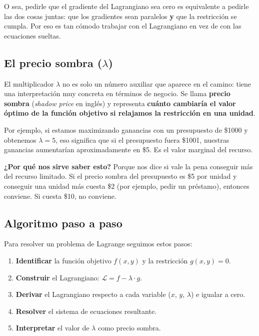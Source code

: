 \documentclass[12pt]{article}
\begin{document}
\vspace{0.5em}

O sea, pedirle que el gradiente del Lagrangiano sea cero es equivalente a pedirle las dos cosas juntas: que los gradientes sean paralelos \textbf{y} que la restricción se cumpla. Por eso es tan cómodo trabajar con el Lagrangiano en vez de con las ecuaciones sueltas.

\subsection{El precio sombra ($\lambda$)}

El multiplicador $\lambda$ no es solo un número auxiliar que aparece en el camino: tiene una interpretación muy concreta en términos de negocio. Se llama \textbf{precio sombra} (\textit{shadow price} en inglés) y representa \textbf{cuánto cambiaría el valor óptimo de la función objetivo si relajamos la restricción en una unidad}.

\vspace{0.5em}

Por ejemplo, si estamos maximizando ganancias con un presupuesto de \$1000 y obtenemos $\lambda = 5$, eso significa que si el presupuesto fuera \$1001, nuestras ganancias aumentarían aproximadamente en \$5. Es el valor marginal del recurso.

\vspace{0.5em}

\textbf{¿Por qué nos sirve saber esto?} Porque nos dice si vale la pena conseguir más del recurso limitado. Si el precio sombra del presupuesto es \$5 por unidad y conseguir una unidad más cuesta \$2 (por ejemplo, pedir un préstamo), entonces conviene. Si cuesta \$10, no conviene.

\subsection{Algoritmo paso a paso}

Para resolver un problema de Lagrange seguimos estos pasos:

\begin{enumerate}
    \item \textbf{Identificar} la función objetivo $f(x, y)$ y la restricción $g(x, y) = 0$.
    \item \textbf{Construir} el Lagrangiano: $\mathcal{L} = f - \lambda \cdot g$.
    \item \textbf{Derivar} el Lagrangiano respecto a cada variable ($x$, $y$, $\lambda$) e igualar a cero.
    \item \textbf{Resolver} el sistema de ecuaciones resultante.
    \item \textbf{Interpretar} el valor de $\lambda$ como precio sombra.
\end{enumerate}
\end{document}
